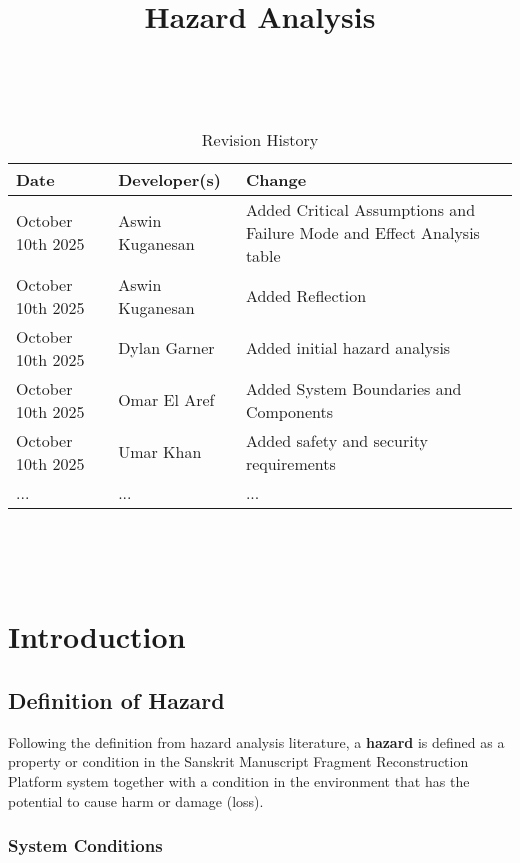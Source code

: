 \documentclass{article}
\title{Hazard Analysis\\\progname}
\author{\authname}
\date{}
\begin{document}
\maketitle
\thispagestyle{empty}

~\newpage


\begin{table}[hp]
\caption{Revision History} \label{TblRevisionHistory}
\begin{tabularx}{\textwidth}{llX}
\toprule
\textbf{Date} & \textbf{Developer(s)} & \textbf{Change}\\
\midrule
October 10th 2025 & Aswin Kuganesan & Added Critical Assumptions and Failure Mode and Effect Analysis table\\
October 10th 2025 & Aswin Kuganesan & Added Reflection\\
October 10th 2025 & Dylan Garner & Added initial hazard analysis\\
October 10th 2025 & Omar El Aref & Added System Boundaries and Components\\
October 10th 2025 & Umar Khan & Added safety and security requirements\\
... & ... & ...\\
\bottomrule
\end{tabularx}
\end{table}

~\newpage

\tableofcontents

~\newpage



\section{Introduction}

\subsection{Definition of Hazard}

Following the definition from hazard analysis literature, a \textbf{hazard} is defined as a property or condition in the Sanskrit Manuscript Fragment Reconstruction Platform system together with a condition in the environment that has the potential to cause harm or damage (loss).

\subsubsection{System Conditions}
\end{document}
